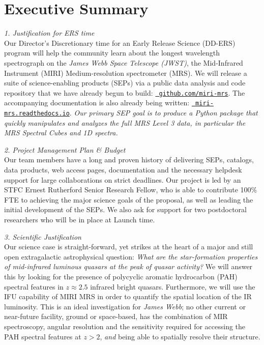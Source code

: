 \vspace{-4pt}
\section*{{\sc Executive Summary}}

\vspace{-6pt}
\noindent
{\it 1. Justification for ERS time}\\
Our Director's Discretionary time for an Early Release Science
(DD-ERS) program will help the community learn about the longest
wavelength spectrograph on the {\it James Webb Space Telescope
(JWST)}, the Mid-Infrared Instrument (MIRI) Medium-resolution
spectrometer (MRS).  We will release a suite of science-enabling
products (SEPs) via a public data analysis and code repository that we
have already begun to build: \href{https://github.com/miri-mrs}{\tt
github.com/miri-mrs}.  The accompanying documentation is also already
being written: \href{http://miri-mrs.readthedocs.io/}{{\tt
miri-mrs.readthedocs.io}}.  {\it Our primary SEP goal is to produce a
Python package that quickly manipulates and analyzes the full MRS
Level 3 data, in particular the MRS Spectral Cubes and 1D spectra.}

\smallskip \smallskip \smallskip
\noindent
{\it 2. Project Management Plan \& Budget} \\
Our team members have a long and proven history of delivering SEPs,
catalogs, data products, web access pages, documentation and the
necessary helpdesk support for large collaborations on strict
deadlines.  Our project is led by an STFC Ernest Rutherford Senior
Research Fellow, who is able to contribute 100\% FTE to achieving the
major science goals of the proposal, as well as leading the initial
development of the SEPs. We also ask for support for two postdoctoral
researchers who will be in place at Launch time.

\smallskip \smallskip \smallskip
\noindent
{\it 3. Scientific Justification}\\
Our science case is straight-forward, yet strikes at the heart of a
major and still open extragalactic astrophysical question: {\it What
are the star-formation properties of mid-infrared luminous quasars at
the peak of quasar activity? } We will answer this by looking for the
presence of polycyclic aromatic hydrocarbon (PAH) spectral features in
$z\approx2.5$ infrared bright quasars.  Furthermore, we will use the
IFU capability of MIRI MRS in order to quantify the spatial location
of the IR luminosity. This is an ideal investigation for {\it James
Webb}; no other current or near-future facility, ground or
space-based, has the combination of MIR spectroscopy, angular
resolution and the sensitivity required for accessing the PAH spectral
features at $z>2$, {\it and} being able to spatially resolve their
structure.


